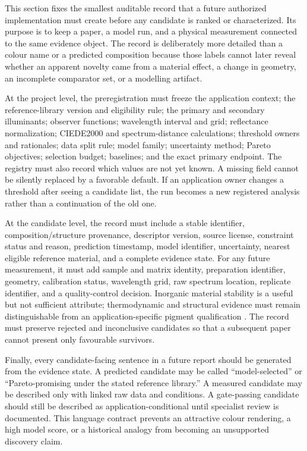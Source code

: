 \documentclass[conference]{IEEEtran}
\begin{document}
This section fixes the smallest auditable record that a future authorized implementation must create before any candidate is ranked or characterized. Its purpose is to keep a paper, a model run, and a physical measurement connected to the same evidence object. The record is deliberately more detailed than a colour name or a predicted composition because those labels cannot later reveal whether an apparent novelty came from a material effect, a change in geometry, an incomplete comparator set, or a modelling artifact.

At the project level, the preregistration must freeze the application context; the reference-library version and eligibility rule; the primary and secondary illuminants; observer functions; wavelength interval and grid; reflectance normalization; CIEDE2000 and spectrum-distance calculations; threshold owners and rationales; data split rule; model family; uncertainty method; Pareto objectives; selection budget; baselines; and the exact primary endpoint. The registry must also record which values are not yet known. A missing field cannot be silently replaced by a favorable default. If an application owner changes a threshold after seeing a candidate list, the run becomes a new registered analysis rather than a continuation of the old one.

At the candidate level, the record must include a stable identifier, composition/structure provenance, descriptor version, source license, constraint status and reason, prediction timestamp, model identifier, uncertainty, nearest eligible reference material, and a complete evidence state. For any future measurement, it must add sample and matrix identity, preparation identifier, geometry, calibration status, wavelength grid, raw spectrum location, replicate identifier, and a quality-control decision. Inorganic material stability is a useful but not sufficient attribute; thermodynamic and structural evidence must remain distinguishable from an application-specific pigment qualification \cite{sun}. The record must preserve rejected and inconclusive candidates so that a subsequent paper cannot present only favourable survivors.

Finally, every candidate-facing sentence in a future report should be generated from the evidence state. A predicted candidate may be called ``model-selected'' or ``Pareto-promising under the stated reference library.'' A measured candidate may be described only with linked raw data and conditions. A gate-passing candidate should still be described as application-conditional until specialist review is documented. This language contract prevents an attractive colour rendering, a high model score, or a historical analogy from becoming an unsupported discovery claim.
\end{document}
